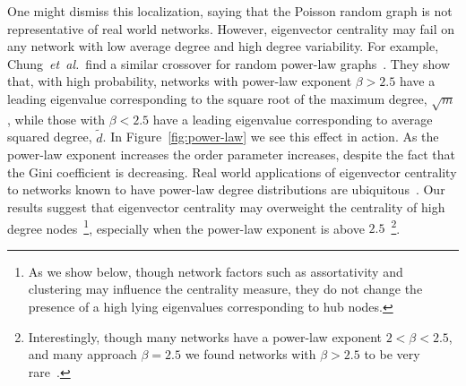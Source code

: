 \documentclass[twocolumn,prl,superscriptaddress]{revtex4}
\newcommand{\etal}{{\it{}et~al.}}
\begin{document}
One might dismiss this localization, saying that the Poisson random graph is not representative of real world networks. However, eigenvector centrality may fail on any network with low average degree and high degree variability. For example, Chung~\etal\ find a similar crossover for random power-law graphs~\cite{chung03}. They show that, with high probability, networks with power-law exponent $\beta > 2.5$ have a leading eigenvalue corresponding to the square root of the maximum degree, $\sqrt{m}$, while those with $\beta < 2.5$ have a leading eigenvalue corresponding to average squared degree, $\tilde{d}$. In Figure~\ref{fig:power-law} we see this effect in action. As the power-law exponent increases the order parameter increases, despite the fact that the Gini coefficient is decreasing. %
Real world applications of eigenvector centrality to networks known to have power-law degree distributions are ubiquitous~\cite{canright06,page99}. Our results suggest that eigenvector centrality may overweight the centrality of high degree nodes~\footnote{As we show below, though network factors such as assortativity and clustering may influence the centrality measure, they do not change the presence of a high lying eigenvalues corresponding to hub nodes.}, especially when the power-law exponent is above $2.5$~\footnote{Interestingly, though many networks have a power-law exponent $2 < \beta < 2.5$, and many approach $\beta = 2.5$ we found networks with $\beta > 2.5$ to be very rare~\cite{newman03}.}.
\end{document}
